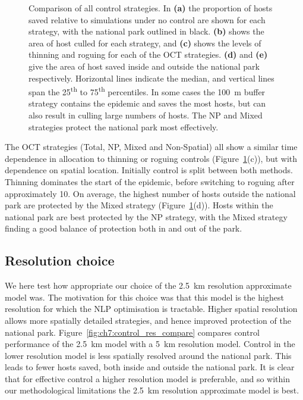 \begin{figure}
    \begin{center}
        \caption[Comparison of all control strategies]{Comparison of all control strategies. In \textbf{(a)} the proportion of hosts saved relative to simulations under no control are shown for each strategy, with the national park outlined in black. \textbf{(b)} shows the area of host culled for each strategy, and \textbf{(c)} shows the levels of thinning and roguing for each of the OCT strategies. \textbf{(d)} and \textbf{(e)} give the area of host saved inside and outside the national park respectively. Horizontal lines indicate the median, and vertical lines span the 25\textsuperscript{th} to 75\textsuperscript{th} percentiles. In some cases the \SI{100}{\meter} buffer strategy contains the epidemic and saves the most hosts, but can also result in culling large numbers of hosts. The NP and Mixed strategies protect the national park most effectively.\label{fig:ch7:strat_comparison}}
    \end{center}
\end{figure}

The OCT strategies (Total, NP, Mixed and Non-Spatial) all show a similar time dependence in allocation to thinning or roguing controls (Figure~\ref{fig:ch7:strat_comparison}(c)), but with dependence on spatial location. Initially control is split between both methods. Thinning dominates the start of the epidemic, before switching to roguing after approximately \SI{10}{\years}. On average, the highest number of hosts outside the national park are protected by the Mixed strategy (Figure~\ref{fig:ch7:strat_comparison}(d)). Hosts within the national park are best protected by the NP strategy, with the Mixed strategy finding a good balance of protection both in and out of the park.

\subsection{Resolution choice}

We here test how appropriate our choice of the \SI{2.5}{\km} resolution approximate model was. The motivation for this choice was that this model is the highest resolution for which the NLP optimisation is tractable. Higher spatial resolution allows more spatially detailed strategies, and hence improved protection of the national park. Figure~\ref{fig:ch7:control_res_compare} compares control performance of the \SI{2.5}{\km} model with a \SI{5}{\km} resolution model. Control in the lower resolution model is less spatially resolved around the national park. This leads to fewer hosts saved, both inside and outside the national park. It is clear that for effective control a higher resolution model is preferable, and so within our methodological limitations the \SI{2.5}{\km} resolution approximate model is best.

